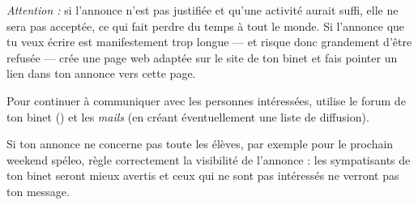 \emph{Attention :} si l'annonce n'est pas justifiée et qu'une activité aurait suffi, elle ne sera pas acceptée, ce qui fait perdre du temps à tout le
monde. Si l'annonce que tu veux écrire est manifestement trop longue --- et risque donc grandement d'être refusée --- crée une page web adaptée sur le
site de ton binet et fais pointer un lien dans ton annonce vers cette page.

Pour continuer à communiquer avec les personnes intéressées, utilise
le forum de ton binet () et les \emph{mails}
(en créant éventuellement une liste de diffusion).

Si ton annonce ne concerne pas toute les élèves, par
exemple pour le prochain weekend spéleo, règle correctement la
visibilité de l'annonce : les sympatisants de ton binet seront mieux
avertis et ceux qui ne sont pas intéressés ne verront pas ton message.